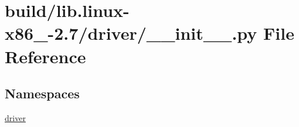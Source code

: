 \hypertarget{build_2lib_8linux-x86__64-2_87_2driver_2____init_____8py}{}\section{build/lib.linux-\/x86\+\_-\/2.7/driver/\+\_\+\+\_\+init\+\_\+\+\_\+.py File Reference}
\label{build_2lib_8linux-x86__64-2_87_2driver_2____init_____8py}
\subsection*{Namespaces}
\begin{DoxyCompactItemize}
\item 
 \hyperlink{namespacedriver}{driver}
\end{DoxyCompactItemize}
